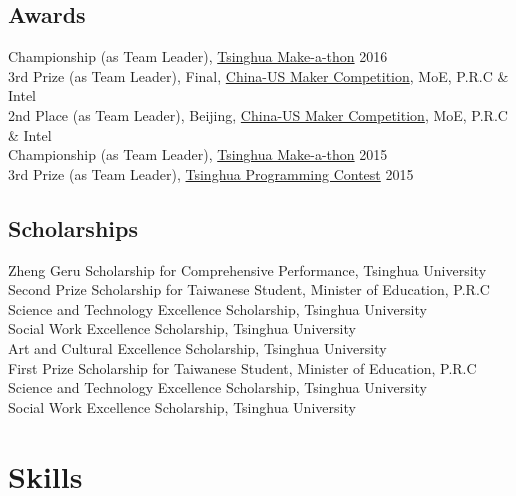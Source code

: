 \documentclass[11pt, a4paper]{article} %
\newcommand{\years}[1]{\marginnote{\scriptsize #1}} %
\begin{document}
\subsection*{Awards}
\years{2016}
Championship (as Team Leader), \href{http://thumaker.cn/blog/2017%E5%88%9B%E5%AE%A2%E6%8C%91%E6%88%98%E8%B5%9B-%E6%8A%A5%E5%90%8D%E4%BB%85%E6%AD%A4%E4%B8%80%E5%91%A8/}{Tsinghua Make-a-thon} 2016\\
\years{2015}
3rd Prize (as Team Leader), Final, \href{https://www.chinaus-maker.org/}{China-US Maker Competition}, MoE, P.R.C \& Intel\\
2nd Place (as Team Leader), Beijing, \href{https://www.chinaus-maker.org/}{China-US Maker Competition}, MoE, P.R.C \& Intel\\
Championship (as Team Leader), \href{http://thumaker.cn/blog/2017%E5%88%9B%E5%AE%A2%E6%8C%91%E6%88%98%E8%B5%9B-%E6%8A%A5%E5%90%8D%E4%BB%85%E6%AD%A4%E4%B8%80%E5%91%A8/}{Tsinghua Make-a-thon} 2015\\
3rd Prize (as Team Leader), \href{https://cpclash.eesast.com/}{Tsinghua Programming Contest} 2015
\subsection*{Scholarships}
\years{2016}
Zheng Geru Scholarship for Comprehensive Performance, Tsinghua University\\
Second Prize Scholarship for Taiwanese Student, Minister of Education, P.R.C\\
Science and Technology Excellence Scholarship, Tsinghua University\\
Social Work Excellence Scholarship, Tsinghua University\\
Art and Cultural Excellence Scholarship, Tsinghua University\\
\years{2015} 
First Prize Scholarship for Taiwanese Student, Minister of Education, P.R.C\\
Science and Technology Excellence Scholarship, Tsinghua University\\
Social Work Excellence Scholarship, Tsinghua University






\section*{Skills}
\end{document}
